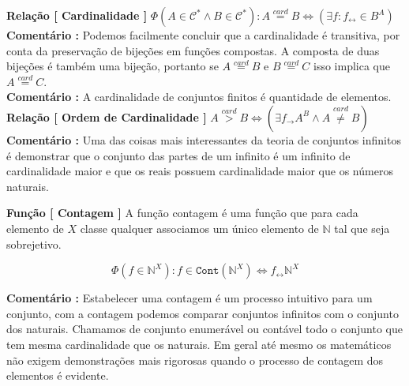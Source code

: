 \documentclass[10pt,a4paper]{report}
\begin{document}
\hspace{\baselineskip}

\textbf{Relação [ Cardinalidade ]} $ \Phi( A \in \mathcal{C}^* \wedge B \in \mathcal{C}^* ) : A \overset{card}{=} B \iff ( \exists f: f_{\leftrightarrow} \in B^A )  $\\

\textbf{Comentário :} Podemos facilmente concluir que a cardinalidade é transitiva, por conta da preservação de bijeções em funções compostas. A composta de duas bijeções é também uma bijeção, portanto se $A \overset{card}{=} B$ e $ B \overset{card}{=}C $ isso implica que $ A \overset{card}{=} C $.\\

\textbf{Comentário :} A cardinalidade de conjuntos finitos é quantidade de elementos.\\

\textbf{Relação [ Ordem de Cardinalidade ]} $ A \overset{card}{>} B \iff ( \exists f_{\rightarrow} A^B \wedge A \overset{card}{\ne} B ) $ \\

\textbf{Comentário :} Uma das coisas mais interessantes da teoria de conjuntos infinitos é demonstrar que o conjunto das partes de um infinito é um infinito de cardinalidade maior e que os reais possuem cardinalidade maior que os números naturais.

\hspace{\baselineskip}

\textbf{Função [ Contagem ]} A função contagem é uma função que para cada elemento de $X$ classe qualquer associamos um único elemento de $\mathbb{N}$ tal que seja sobrejetivo.

$$ \Phi( f \in \mathbb{N}^X ) : f \in \texttt{Cont}( \mathbb{N}^X ) \iff f_{\leftrightarrow} \mathbb{N}^X  $$

% 
\textbf{Comentário :} Estabelecer uma contagem é um processo intuitivo para um conjunto, com a contagem podemos comparar conjuntos infinitos com o conjunto dos naturais. Chamamos de conjunto enumerável ou contável todo o conjunto que tem mesma cardinalidade que os naturais. Em geral até mesmo os matemáticos não exigem demonstrações mais rigorosas quando o processo de contagem dos elementos é evidente.\\
\end{document}
